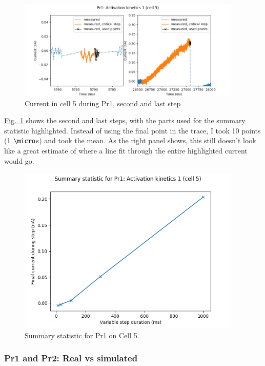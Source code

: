 \documentclass[preprint,authoryear,10pt]{elsarticle}
\newcommand\Fig[2][]{\hyperref[fig:#2]{Fig.~\ref*{fig:#2}\ifstrempty{#1}{}{.#1}}}
\begin{document}
\begin{figure}[H]
\centerline{
\includegraphics[width=0.95\textwidth]{fig/pr1-cell-5-zoom}
}
\caption{%
Current in cell 5 during Pr1, second and last step
}
\label{fig:analysis-pr1-cell-5-zoom}
\end{figure}

\Fig{analysis-pr1-cell-5-zoom} shows the second and last steps, with the parts
 used for the summary statistic highlighted.
Instead of using the final point in the trace, I took 10 points (1 $\micro$s)
 and took the mean.
As the right panel shows, this still doesn't look like a great estimate of
 where a line fit through the entire highlighted current would go.

\begin{figure}[H]
\centerline{
\includegraphics[width=0.95\textwidth]{fig/pr1-cell-5-statistic}
}
\caption{%
Summary statistic for Pr1 on Cell 5.
}
\label{fig:analysis-pr1-cell-5-statistic}
\end{figure}

%
%
\subsubsection{Pr1 and Pr2: Real vs simulated}
\end{document}
